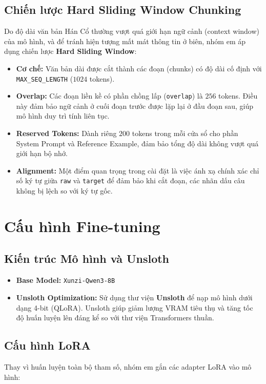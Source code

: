 \subsection{Chiến lược Hard Sliding Window Chunking}
Do độ dài văn bản Hán Cổ thường vượt quá giới hạn ngữ cảnh (context window) của mô hình, và để tránh hiện tượng mất mát thông tin ở biên, nhóm em áp dụng chiến lược \textbf{Hard Sliding Window}:
\begin{itemize}
    \item \textbf{Cơ chế:} Văn bản dài được cắt thành các đoạn (chunks) có độ dài cố định với \texttt{MAX\_SEQ\_LENGTH} ($1024$ tokens).
    \item \textbf{Overlap:} Các đoạn liền kề có phần chồng lấp (\texttt{overlap}) là $256$ tokens. Điều này đảm bảo ngữ cảnh ở cuối đoạn trước được lặp lại ở đầu đoạn sau, giúp mô hình duy trì tính liên tục.
    \item \textbf{Reserved Tokens:} Dành riêng $200$ tokens trong mỗi cửa sổ cho phần System Prompt và Reference Example, đảm bảo tổng độ dài không vượt quá giới hạn bộ nhớ.
    \item \textbf{Alignment:} Một điểm quan trọng trong cài đặt là việc ánh xạ chính xác chỉ số ký tự giữa \texttt{raw} và \texttt{target} để đảm bảo khi cắt đoạn, các nhãn dấu câu không bị lệch so với ký tự gốc.
\end{itemize}


\section{Cấu hình Fine-tuning}

\subsection{Kiến trúc Mô hình và Unsloth}
\begin{itemize}
    \item \textbf{Base Model:} \texttt{Xunzi-Qwen3-8B}
    \item \textbf{Unsloth Optimization:} Sử dụng thư viện \textbf{Unsloth} để nạp mô hình dưới dạng 4-bit (QLoRA). Unsloth giúp giảm lượng VRAM tiêu thụ và tăng tốc độ huấn luyện lên đáng kể so với thư viện Transformers thuần.
\end{itemize}

\subsection{Cấu hình LoRA}
Thay vì huấn luyện toàn bộ tham số, nhóm em gắn các adapter LoRA vào mô hình:

